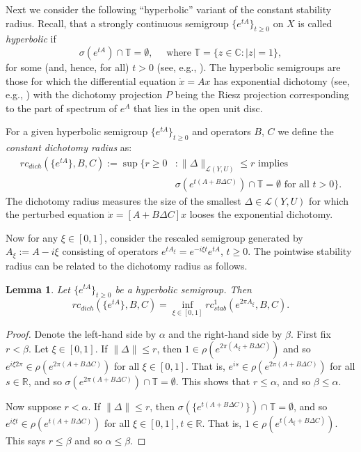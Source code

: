 \documentclass[10pt,psamsfonts,leqno]{siamltex}
\newtheorem{lem}[prop]{Lemma}
\newcommand{\bbC}{\mathbb{C}}
\newcommand{\bbR}{\mathbb{R}}
\newcommand{\bbT}{\mathbb{T}}
\newcommand{\rcstab}{rc_{stab}}
\begin{document}
Next we consider the following ``hyperbolic'' variant of the constant
stability radius. Recall, that a strongly continuous semigroup
$\{e^{tA}\}_{t\ge 0}$ on $X$ is called {\it hyperbolic} if
\[
\sigma(e^{tA})\cap\bbT=\emptyset,\quad\mbox{ where }
\bbT=\{z\in\bbC: |z|=1\},
\]
for some (and, hence, for all) $t>0$ (see, e.g., \cite{vanNbook}).
The hyperbolic semigroups are those for which the differential
equation $\dot x=Ax$ has exponential dichotomy (see, e.g., \cite{DK})
with the dichotomy projection $P$ being the Riesz projection
corresponding to the part of spectrum of $e^A$ that lies in
the open unit disc.

For a given hyperbolic semigroup $\{e^{tA}\}_{t\ge 0}$ and
 operators $B$, $C$ we define
 the {\it constant dichotomy radius} as:
\begin{equation*}
\begin{aligned}
rc_{dich}(\{e^{tA}\},B,C):= \sup\{
  r\ge 0&: \|\Delta\|_{\mathcal{L}(Y,U)}\le r \mbox{ implies }\\
  &\sigma(e^{t(A+B\Delta C)})\cap\bbT=\emptyset
  \mbox{ for all } t>0\}.
\end{aligned}
\end{equation*}
\noindent The dichotomy radius measures the size of the smallest
$\Delta\in\mathcal{L}(Y,U)$
for which  the perturbed equation $\dot x=[A+B\Delta C]x$ looses the
exponential dichotomy.

Now for any $\xi\in[0,1]$, consider the rescaled semigroup generated by
$A_\xi:=A-i\xi$ consisting of operators $e^{tA_\xi}=e^{-i\xi t}e^{tA}$,
$t\ge0$.  The pointwise stability radius can be related to the
dichotomy radius as follows.

\begin{lem}\label{dichrad}
 Let $\{e^{tA}\}_{t\ge0}$ be a hyperbolic semigroup.
Then
\[
rc_{dich}(\{e^{tA}\},B,C)=\inf_{\xi\in[0,1]}\rcstab^1(e^{2\pi
A_\xi},B,C).
\]
\end{lem}

\begin{proof} Denote the left-hand side by $\alpha$ and the right-hand
side by $\beta$.     First fix $r<\beta$.  Let $\xi\in[0,1]$. If
$\|\Delta\|\le r$, then $1\in\rho(e^{2\pi(A_\xi+B\Delta C)})$ and so
 $e^{i\xi 2\pi}\in\rho(e^{2\pi(A+B\Delta C)})$
for all $\xi\in[0,1]$.  That is, $e^{is}\in\rho(e^{2\pi(A+B\Delta C)})$
for all $s\in\bbR$, and so $\sigma(e^{2\pi(A+B\Delta C)})\cap\bbT
=\emptyset$.  This shows that $r\le\alpha$, and so
 $\beta\le\alpha$.

Now suppose $r<\alpha$.  If $\|\Delta\|\le r$, then
$\sigma(\{e^{t(A+B\Delta C)}\})\cap\bbT=\emptyset$, and so
$e^{i\xi t}\in\rho(e^{t(A+B\Delta C)})$ for all $\xi\in[0,1], t\in\bbR$.
That is, $1\in\rho(e^{t(A_\xi+B\Delta C)})$.
This says $r\le \beta$ and so $\alpha\le \beta$.
\end{proof}
\end{document}
